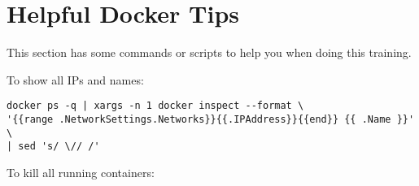 \section{Helpful Docker Tips}

This section has some commands or scripts to help you when doing this
training.

To show all IPs and names:

\begin{Verbatim}[breaklines=true]
docker ps -q | xargs -n 1 docker inspect --format \
'{{range .NetworkSettings.Networks}}{{.IPAddress}}{{end}} {{ .Name }}' \
| sed 's/ \// /'
\end{Verbatim}

To kill all running containers:


